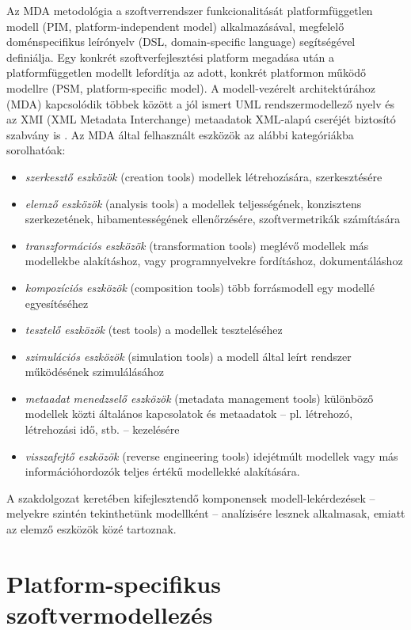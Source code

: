 Az \gls{MDA} metodológia a szoftverrendszer funkcionalitását platformfüggetlen modell (\gls{PIM}, platform-independent model) alkalmazásával, megfelelő doménspecifikus leírónyelv (\gls{DSL}, domain-specific language) segítségével definiálja.
Egy konkrét szoftverfejlesztési platform megadása után a platformfüggetlen modellt lefordítja az adott, konkrét platformon működő modellre (\gls{PSM}, platform-specific model).
A modell-vezérelt architektúrához (\gls{MDA}) kapcsolódik többek között a jól ismert \gls{UML} rendszermodellező nyelv és az \gls{XMI} (XML Metadata Interchange) metaadatok XML-alapú cseréjét biztosító szabvány is \cite{wiki:ModelDrivenArchitecture}. 
Az \gls{MDA} által felhasznált eszközök az alábbi kategóriákba sorolhatóak:
\begin{itemize}
	\item \emph{szerkesztő eszközök} (creation tools) modellek létrehozására, szerkesztésére
	\item \emph{elemző eszközök} (analysis tools) a modellek teljességének, konzisztens szerkezetének, hibamentességének ellenőrzésére, szoftvermetrikák számítására
	\item \emph{transzformációs eszközök} (transformation tools) meglévő modellek más modellekbe alakításhoz, vagy programnyelvekre fordításhoz, dokumentáláshoz
	\item \emph{kompozíciós eszközök} (composition tools) több forrásmodell egy modellé egyesítéséhez
	\item \emph{tesztelő eszközök} (test tools) a modellek teszteléséhez
	\item \emph{szimulációs eszközök} (simulation tools) a modell által leírt rendszer működésének szimulálásához
	\item \emph{metaadat menedzselő eszközök} (metadata management tools) különböző modellek közti általános kapcsolatok és metaadatok -- pl. létrehozó, létrehozási idő, stb. -- kezelésére
	\item \emph{visszafejtő eszközök} (reverse engineering tools) idejétmúlt modellek vagy más információhordozók teljes értékű modellekké alakítására.
\end{itemize}

A szakdolgozat keretében kifejlesztendő komponensek modell-lekérdezések -- melyekre szintén tekinthetünk modellként -- analízisére lesznek alkalmasak, emiatt az elemző eszközök közé tartoznak. 


\section{Platform-specifikus szoftvermodellezés}

